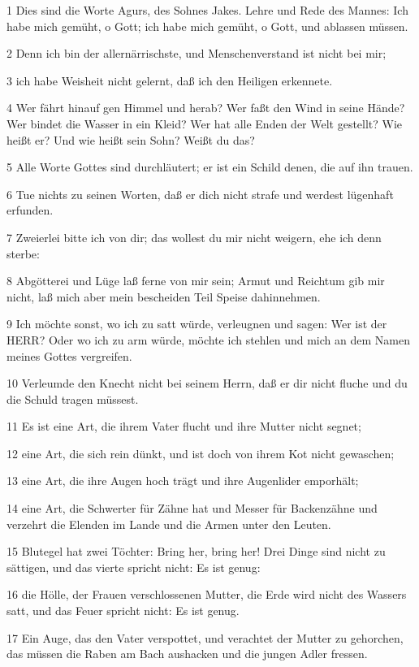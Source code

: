 \par 1 Dies sind die Worte Agurs, des Sohnes Jakes. Lehre und Rede des Mannes: Ich habe mich gemüht, o Gott; ich habe mich gemüht, o Gott, und ablassen müssen.
\par 2 Denn ich bin der allernärrischste, und Menschenverstand ist nicht bei mir;
\par 3 ich habe Weisheit nicht gelernt, daß ich den Heiligen erkennete.
\par 4 Wer fährt hinauf gen Himmel und herab? Wer faßt den Wind in seine Hände? Wer bindet die Wasser in ein Kleid? Wer hat alle Enden der Welt gestellt? Wie heißt er? Und wie heißt sein Sohn? Weißt du das?
\par 5 Alle Worte Gottes sind durchläutert; er ist ein Schild denen, die auf ihn trauen.
\par 6 Tue nichts zu seinen Worten, daß er dich nicht strafe und werdest lügenhaft erfunden.
\par 7 Zweierlei bitte ich von dir; das wollest du mir nicht weigern, ehe ich denn sterbe:
\par 8 Abgötterei und Lüge laß ferne von mir sein; Armut und Reichtum gib mir nicht, laß mich aber mein bescheiden Teil Speise dahinnehmen.
\par 9 Ich möchte sonst, wo ich zu satt würde, verleugnen und sagen: Wer ist der HERR? Oder wo ich zu arm würde, möchte ich stehlen und mich an dem Namen meines Gottes vergreifen.
\par 10 Verleumde den Knecht nicht bei seinem Herrn, daß er dir nicht fluche und du die Schuld tragen müssest.
\par 11 Es ist eine Art, die ihrem Vater flucht und ihre Mutter nicht segnet;
\par 12 eine Art, die sich rein dünkt, und ist doch von ihrem Kot nicht gewaschen;
\par 13 eine Art, die ihre Augen hoch trägt und ihre Augenlider emporhält;
\par 14 eine Art, die Schwerter für Zähne hat und Messer für Backenzähne und verzehrt die Elenden im Lande und die Armen unter den Leuten.
\par 15 Blutegel hat zwei Töchter: Bring her, bring her! Drei Dinge sind nicht zu sättigen, und das vierte spricht nicht: Es ist genug:
\par 16 die Hölle, der Frauen verschlossenen Mutter, die Erde wird nicht des Wassers satt, und das Feuer spricht nicht: Es ist genug.
\par 17 Ein Auge, das den Vater verspottet, und verachtet der Mutter zu gehorchen, das müssen die Raben am Bach aushacken und die jungen Adler fressen.

